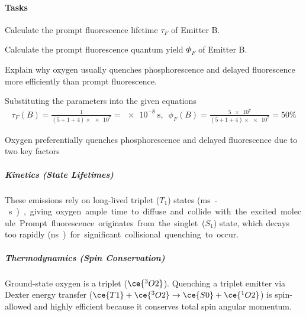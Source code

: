 \begin{problem}[note =
    {Fluorescence, Phosphorescence, and Delayed Fluorescence}]
  \paragraph{Tasks}
  \begin{enumext}
    \item Calculate the prompt fluorescence lifetime $\tau_F$ of Emitter B.
    \item Calculate the prompt fluorescence quantum yield $\Phi_F$ of Emitter B.
    \item Explain why oxygen usually quenches phosphorescence and delayed
    fluorescence more efficiently than prompt fluorescence.
  \end{enumext}
\end{problem}
\begin{solution}\leavevmode
  \begin{enumext}
    \item [(a) (b)] Substituting the parameters into the given equations
    \begin{align*}
      \tau_F(B)
    = \frac{1}{(5 + 1 + 4)\times \num{e7}} = \qty{e-8}{\s},\enspace
      \phi_F(B)
    = \frac{\num{5e7}}{(5 + 1 + 4)\times \num{e7}} = 50\%
    \end{align*}
    \addtocounter{enumXi}{2}
    \item Oxygen preferentially quenches phosphorescence and delayed fluorescence due to two key factors
    \subparagraph{Kinetics (State Lifetimes)}%
    These emissions rely on long-lived
    triplet ($T_1$) states (\unit\ms-\unit\s), giving oxygen ample time to
    diffuse and collide with the excited molecule. Prompt fluorescence
    originates from the singlet ($S_1$) state, which decays too rapidly
    (\unit\ns) for significant collisional quenching to occur.
    \subparagraph{Thermodynamics (Spin Conservation)}%
    Ground-state oxygen is a
    triplet ($\ce{^3O2}$). Quenching a triplet emitter via Dexter energy transfer ($\ce{T1} + \ce{^3O2} \to \ce{S0} + \ce{^1O2}$) is spin-allowed
    and highly efficient because it conserves total spin angular momentum.
  \end{enumext}
\end{solution}